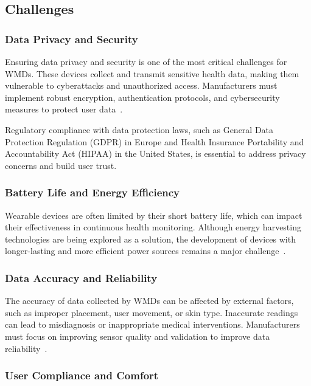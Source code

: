 \documentclass[journal]{IEEEtran}
\begin{document}
    \subsection{Challenges}

        \subsubsection{Data Privacy and Security}

        Ensuring data privacy and security is one of the most critical challenges for WMDs. These devices collect and transmit sensitive health data, making them vulnerable to cyberattacks and unauthorized access. Manufacturers must implement robust encryption, authentication protocols, and cybersecurity measures to protect user data~\cite{Iqbal2016}.

        Regulatory compliance with data protection laws, such as General Data Protection Regulation (GDPR) in Europe and Health Insurance Portability and Accountability Act (HIPAA) in the United States, is essential to address privacy concerns and build user trust.

        \subsubsection{Battery Life and Energy Efficiency}

        Wearable devices are often limited by their short battery life, which can impact their effectiveness in continuous health monitoring. Although energy harvesting technologies are being explored as a solution, the development of devices with longer-lasting and more efficient power sources remains a major challenge~\cite{Ates2022,Gao2024}.

        \subsubsection{Data Accuracy and Reliability}

        The accuracy of data collected by WMDs can be affected by external factors, such as improper placement, user movement, or skin type. Inaccurate readings can lead to misdiagnosis or inappropriate medical interventions. Manufacturers must focus on improving sensor quality and validation to improve data reliability~\cite{Lu2020, Babu2024}.

        \subsubsection{User Compliance and Comfort}
\end{document}
